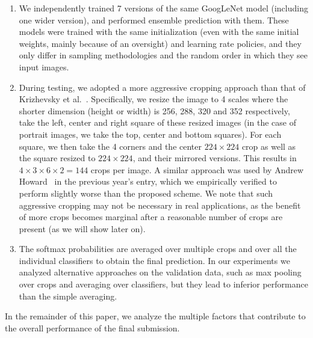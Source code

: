 \begin{enumerate}
\item We independently trained 7 versions of the same GoogLeNet model (including one wider version), and performed ensemble prediction with them. These models were trained with the same initialization (even with the same initial weights, mainly because of an oversight) and learning rate policies, and they only differ in sampling methodologies and the random order in which they see input images.
\item During testing, we adopted a more aggressive cropping approach than that of Krizhevsky et al.~\cite{krizhevsky2012imagenet}. Specifically, we resize the image to 4 scales where the shorter dimension (height or width) is 256, 288, 320 and 352 respectively, take the left, center and right square of these resized images (in the case of portrait images, we take the top, center and bottom squares). For each square, we then take the 4 corners and the center $224{\times}224$ crop as well as the square resized to $224{\times}224$, and their mirrored versions. This results in $4{\times}3{\times}6{\times}2=144$ crops per image. A similar approach was used by Andrew Howard~\cite{howard2013improvements} in the previous year's entry, which we empirically verified to perform slightly worse than the proposed scheme. We note that such aggressive cropping may not be necessary in real applications, as the benefit of more crops becomes marginal after a reasonable number of crops are present (as we will show later on).
\item The softmax probabilities are averaged over multiple crops and over all the individual classifiers to obtain the final prediction. In our experiments we analyzed alternative approaches on the validation data, such as max pooling over crops and averaging over classifiers, but they lead to inferior performance than the simple averaging.
\end{enumerate}

In the remainder of this paper, we analyze the multiple factors that contribute to the overall performance of the final submission.

